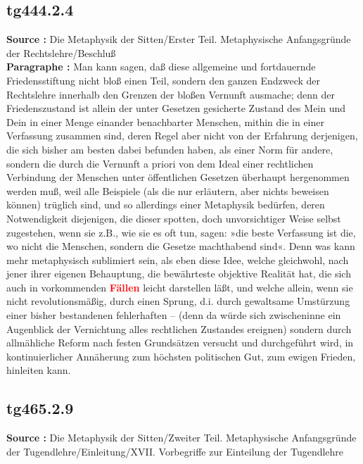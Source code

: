 \documentclass[a4paper,12pt,twoside]{book}
\newcommand{\match}[1]{\textcolor{red}{\textbf{#1}}}
\begin{document}
	\subsection*{tg444.2.4} 
	\textbf{Source : }Die Metaphysik der Sitten/Erster Teil. Metaphysische Anfangsgründe der Rechtslehre/Beschluß\\  
	
	\textbf{Paragraphe : }Man kann sagen, daß diese allgemeine und fortdauernde Friedensstiftung nicht bloß einen Teil, sondern den ganzen Endzweck der Rechtslehre innerhalb den Grenzen der bloßen Vernunft ausmache; denn der Friedenszustand ist allein der unter Gesetzen gesicherte Zustand des Mein und Dein in einer Menge einander benachbarter Menschen, mithin die in einer Verfassung zusammen sind, deren Regel aber nicht von der Erfahrung derjenigen, die sich bisher am besten dabei befunden haben, als einer Norm für andere, sondern die durch die Vernunft a priori von dem Ideal einer rechtlichen Verbindung der Menschen unter öffentlichen Gesetzen überhaupt hergenommen werden muß, weil alle Beispiele (als die nur erläutern, aber nichts beweisen können) trüglich sind, und so allerdings einer Metaphysik bedürfen, deren Notwendigkeit diejenigen, die dieser spotten, doch unvorsichtiger Weise selbst zugestehen, wenn sie z.B., wie sie es oft tun, sagen: »die beste Verfassung ist die, wo nicht die Menschen, sondern die Gesetze machthabend sind«. Denn was kann mehr metaphysisch sublimiert sein, als eben diese Idee, welche gleichwohl, nach jener ihrer eigenen Behauptung, die bewährteste objektive Realität hat, die sich auch in vorkommenden \match{Fällen} leicht darstellen läßt, und welche allein, wenn sie nicht revolutionsmäßig, durch einen Sprung, d.i. durch gewaltsame Umstürzung einer bisher bestandenen fehlerhaften – (denn da würde sich zwischeninne ein Augenblick der Vernichtung alles rechtlichen Zustandes ereignen) sondern durch allmähliche Reform nach festen Grundsätzen versucht und durchgeführt wird, in kontinuierlicher Annäherung zum höchsten politischen Gut, zum ewigen Frieden, hinleiten kann. 
	
	\subsection*{tg465.2.9} 
	\textbf{Source : }Die Metaphysik der Sitten/Zweiter Teil. Metaphysische Anfangsgründe der Tugendlehre/Einleitung/XVII. Vorbegriffe zur Einteilung der Tugendlehre\\  
	
\end{document}
